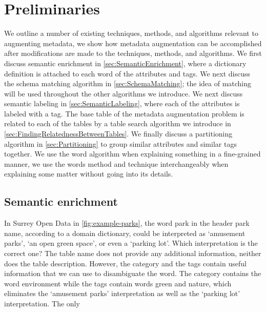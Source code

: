 
\chapter{Preliminaries}
\label{ch:Preliminaries}

We outline a number of existing techniques, methods, and algorithms relevant to augmenting metadata, we show how metadata augmentation can be accomplished after modifications are made to the techniques, methods, and algorithms. We first discuss semantic enrichment in \autoref{sec:SemanticEnrichment}, where a dictionary definition is attached to each word of the attributes and tags. We next discuss the schema matching algorithm in \autoref{sec:SchemaMatching}; the idea of matching will be used throughout the other algorithms we introduce. We next discuss semantic labeling in \autoref{sec:SemanticLabeling}, where each of the attributes is labeled with a tag. The base table of the metadata augmentation problem is related to each of the tables by a table search algorithm we introduce in \autoref{sec:FindingRelatednessBetweenTables}. We finally discuss a partitioning algorithm in \autoref{sec:Partitioning} to group similar attributes and similar tags together. We use the word algorithm when explaining something in a fine-grained manner, we use the words method and technique interchangeably when explaining some matter without going into its details.

\section{Semantic enrichment}
\label{sec:SemanticEnrichment}

In Surrey Open Data in \autoref{fig:example-parks}, the word park in the header park name, according to a domain dictionary, could be interpreted as `amusement parks', `an open green space', or even a `parking lot'. Which interpretation is the correct one? The table name does not provide any additional information, neither does the table description. However, the category and the tags contain useful information that we can use to disambiguate the word. The category contains the word environment while the tags contain words green and nature, which eliminates the `amusement parks' interpretation as well as the `parking lot' interpretation. The only

